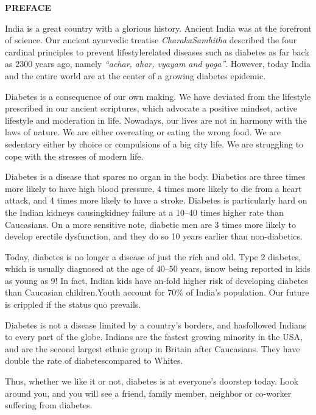 \thispagestyle{empty}


\begin{center}
\Huge\textbf{PREFACE}
\end{center}

\vskip 20pt

India is a great country with a glorious history. Ancient India was at the forefront of science. Our ancient ayurvedic treatise \textit{Charaka\break Samhitha} described the four cardinal principles to prevent lifestyle\break related diseases such as diabetes as far back as 2300 years ago, namely \textit{“achar, ahar, vyayam and yoga”}. However, today India and the entire world are at the center of a growing diabetes epidemic.

Diabetes is a consequence of our own making. We have deviated from the lifestyle prescribed in our ancient scriptures, which advocate a positive mindset, active lifestyle and moderation in life. Nowadays, our lives are not in harmony with the laws of nature. We are either overeating or eating the wrong food. We are sedentary either by choice or compulsions of a big city life. We are struggling to cope with the stresses of modern life.

Diabetes is a disease that spares no organ in the body. Diabetics are three times more likely to have high blood pressure, 4 times more likely to die from a heart attack, and 4 times more likely to have a stroke. Diabetes is particularly hard on the Indian kidneys causing\break kidney failure at a 10–40 times higher rate than Caucasians. On a more sensitive note, diabetic men are 3 times more likely to develop erectile dysfunction, and they do so 10 years earlier than non-diabetics.

Today, diabetes is no longer a disease of just the rich and old. Type 2 diabetes, which is usually diagnosed at the age of 40–50 years, is\break now being reported in kids as young as 9! In fact, Indian kids have an-fold higher risk of developing diabetes than Caucasian children.\break Youth account for 70\% of India's population. Our future is crippled if the status quo prevails.

Diabetes is not a disease limited by a country's borders, and has\break followed Indians to every part of the globe. Indians are the fastest growing minority in the USA, and are the second largest ethnic group in Britain after Caucasians. They have double the rate of diabetes\break compared to Whites.

Thus, whether we like it or not, diabetes is at everyone's doorstep today. Look around you, and you will see a friend, family member, neighbor or co-worker suffering from diabetes.


